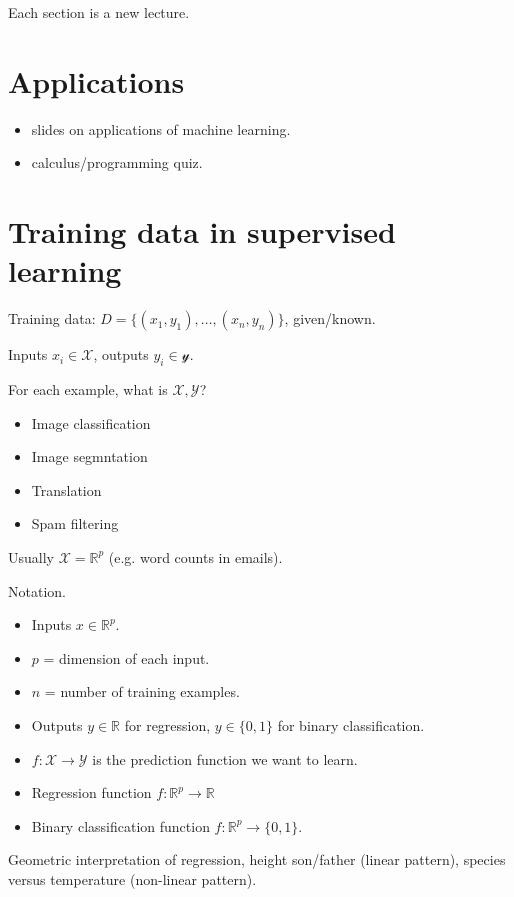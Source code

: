 \documentclass{article}
\begin{document}
Each section is a new lecture.

\section{Applications}
\begin{itemize}
\item slides on applications of machine learning.
\item calculus/programming quiz.
\end{itemize}

\section{Training data in supervised learning}

Training data: $D= \{(x_1,y_1), \dots, (x_n,y_n)\}$, given/known.

Inputs $x_i\in\mathcal X$, outputs
$y_i\in\mathcal y$.

For each example, what is $\mathcal X,\mathcal Y$? 
\begin{itemize}
\item Image classification
\item Image segmntation
\item Translation
\item Spam filtering
\end{itemize}

Usually $\mathcal X = \mathbb R^p$ (e.g. word counts in emails).

Notation. 
\begin{itemize}
\item Inputs $x\in\mathbb R^p$.
\item $p$ = dimension of each input.
\item $n$ = number of training examples.
\item Outputs $y\in\mathbb R$ for regression, $y\in\{0,1\}$ for binary
  classification.
\item $f:\mathcal X\rightarrow \mathcal Y$ is the prediction function
  we want to learn.
\item Regression function $f:\mathbb R^p\rightarrow\mathbb R$
\item Binary classification function $f:\mathbb R^p\rightarrow \{0,1\}$.
\end{itemize}

Geometric interpretation of regression, height son/father (linear
pattern), species versus temperature (non-linear pattern).
\end{document}
